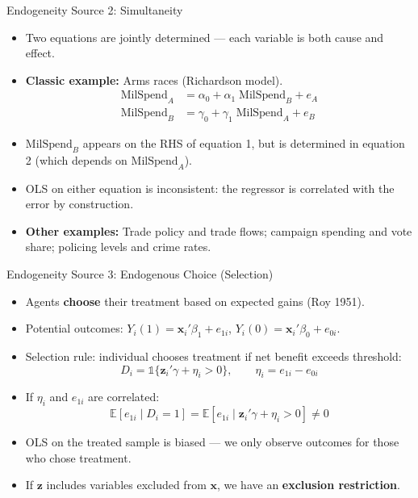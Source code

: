 \documentclass[aspectratio=169, handout]{beamer}
\numberwithin{equation}{section}
\begin{document}
\begin{frame}{Endogeneity Source 2: Simultaneity}
\begin{itemize}
\item Two equations are jointly determined --- each variable is both cause and effect.
\item \textbf{Classic example:} Arms races (Richardson model).
\begin{align*}
\text{MilSpend}_A &= \alpha_0 + \alpha_1\;\text{MilSpend}_B + e_A\\
\text{MilSpend}_B &= \gamma_0 + \gamma_1\;\text{MilSpend}_A + e_B
\end{align*}
\item $\text{MilSpend}_B$ appears on the RHS of equation 1, but is determined in equation 2 (which depends on $\text{MilSpend}_A$).
\item OLS on either equation is inconsistent: the regressor is correlated with the error by construction.
\item \textbf{Other examples:} Trade policy and trade flows; campaign spending and vote share; policing levels and crime rates.
\end{itemize}
\end{frame}


\begin{frame}{Endogeneity Source 3: Endogenous Choice (Selection)}
\begin{itemize}
\item Agents \textbf{choose} their treatment based on expected gains (Roy 1951).
\item Potential outcomes: $Y_i(1)=\bm{x}_i'\beta_1+e_{1i}$, \; $Y_i(0)=\bm{x}_i'\beta_0+e_{0i}$.
\item Selection rule: individual chooses treatment if net benefit exceeds threshold:
$$D_i = \mathbb{1}\{\bm{z}_i'\gamma + \eta_i > 0\}, \qquad \eta_i = e_{1i}-e_{0i}$$
\item If $\eta_i$ and $e_{1i}$ are correlated:
$$\mathbb{E}[e_{1i}\mid D_i=1]=\mathbb{E}[e_{1i}\mid \bm{z}_i'\gamma+\eta_i>0]\neq 0$$
\item OLS on the treated sample is \alert{biased} --- we only observe outcomes for those who chose treatment.
\item If $\bm{z}$ includes variables excluded from $\bm{x}$, we have an \textbf{exclusion restriction}.
\end{itemize}
\end{frame}
\end{document}
